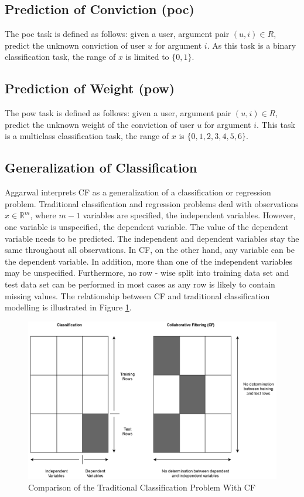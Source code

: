 \subsection{Prediction of Conviction (\acrshort{poc})}
The \acrshort{poc} task is defined as follows: given a user, argument pair $(u,i) \in R$, predict the unknown conviction of user $u$ for argument $i$. As this task is a binary classification task, the range of $x$ is limited to $\{0, 1\}$.
\subsection{Prediction of Weight (\acrshort{pow})}
The \acrshort{pow} task is defined as follows: given a user, argument pair $(u,i) \in R$, predict the unknown weight of the conviction of user $u$ for argument $i$. This task is a multiclass classification task, the range of $x$ is $\{0, 1, 2, 3, 4, 5, 6\}$.
\subsection{Generalization of Classification}
Aggarwal \cite{aggarwal2016recommender} interprets CF as a generalization of a classification or regression problem. Traditional classification and regression problems deal with observations $x \in \mathbb{R}^{m}$, where $m - 1$ variables are specified, the independent variables. However, one variable is unspecified, the dependent variable. The value of the dependent variable needs to be predicted. The independent and dependent variables stay the same throughout all observations. In CF, on the other hand, any variable can be the dependent variable. In addition, more than one of the independent variables may be unspecified. Furthermore, no row - wise split into training data set and test data set can be performed in most cases as any row is likely to contain missing values. The relationship between CF and traditional classification modelling is illustrated in Figure \ref{fig:CFvsClassification}.

\begin{figure}[t]
    \centering
    \includegraphics[width=1\textwidth]{images/CFvsClassification2.jpg}
    \caption{Comparison of the Traditional Classification Problem With CF \cite{aggarwal2016recommender}}
    \label{fig:CFvsClassification}
\end{figure}

